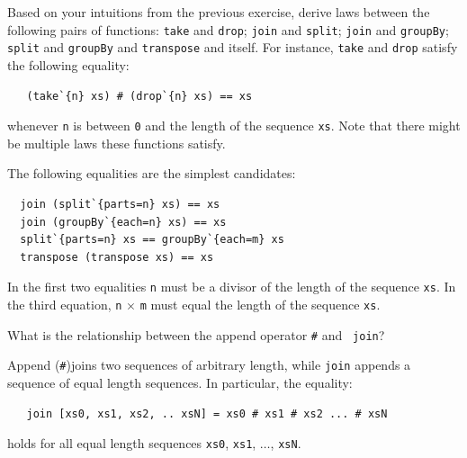 \begin{Exercise}\label{ex:seq:12}
  Based on your intuitions from the previous exercise, derive laws
  between the following pairs of functions: {\tt take} and {\tt drop};
  {\tt join} and {\tt split}; {\tt join} and {\tt groupBy}; {\tt
    split} and {\tt groupBy} and {\tt transpose} and itself.  For
  instance, {\tt take} and {\tt drop} satisfy the following
  equality:\indTake\indDrop\indJoin\indSplit\indGroup\indTranspose
\begin{Verbatim}
   (take`{n} xs) # (drop`{n} xs) == xs
\end{Verbatim}
whenever {\tt n} is between {\tt 0} and the length of the sequence
{\tt xs}. Note that there might be multiple laws these functions
satisfy.
\end{Exercise}
\begin{Answer}
  The following equalities are the simplest
  candidates:\indJoin\indSplit\indGroup\indTranspose
\begin{Verbatim}
  join (split`{parts=n} xs) == xs
  join (groupBy`{each=n} xs) == xs
  split`{parts=n} xs == groupBy`{each=m} xs
  transpose (transpose xs) == xs
\end{Verbatim}
In the first two equalities {\tt n} must be a divisor of the length of
the sequence {\tt xs}.  In the third equation, {\tt n} $\times$ {\tt m}
must equal the length of the sequence {\tt xs}.
\end{Answer}

\begin{Exercise}\label{ex:seq:13}
What is the relationship between the append operator {\tt \#} and {\tt
  join}?\indAppend\indJoin
\end{Exercise}
\begin{Answer}
Append ({\tt \#})\indAppend\indJoin joins two sequences of arbitrary
length, while {\tt join} appends a sequence of equal length
sequences. In particular, the equality:
\begin{Verbatim}
   join [xs0, xs1, xs2, .. xsN] = xs0 # xs1 # xs2 ... # xsN
\end{Verbatim}
holds for all equal length sequences {\tt xs0}, {\tt xs1}, $\ldots$,
{\tt xsN}.
\end{Answer}

